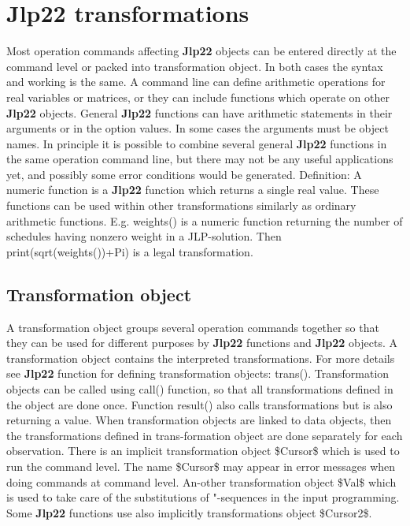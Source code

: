 \section{\textbf{Jlp22} transformations}
\label{jtrans}
Most operation commands affecting \textbf{Jlp22} objects can be entered directly at the command level or
packed into transformation object. In both cases the syntax and working is the same. A
command line can define arithmetic operations for real variables or matrices, or they can
include functions which operate on other \textbf{Jlp22} objects. General \textbf{Jlp22} functions can have arithmetic
statements in their arguments or in the option values. In some cases the arguments must be
object names. In principle it is possible to combine several general \textbf{Jlp22} functions in the same
operation command line, but there may not be any useful applications yet, and possibly some
error conditions would be generated.
Definition: A numeric function is a \textbf{Jlp22} function which returns a single real value. These functions
can be used within other transformations similarly as ordinary arithmetic functions. E.g.
\textcolor{VioletRed}{weights}() is a numeric function returning the number of schedules having nonzero weight
in a JLP-solution. Then \textcolor{VioletRed}{print}(\textcolor{VioletRed}{sqrt}(\textcolor{VioletRed}{weights}())+Pi) is a legal transformation.
\subsection{Transformation object}
\label{transo}
A transformation object groups several operation commands together so that they
can be used for different purposes by \textbf{Jlp22} functions and \textbf{Jlp22} objects. A
transformation object contains the interpreted transformations. For more details
see \textbf{Jlp22} function for defining transformation objects: \textcolor{VioletRed}{trans}().
Transformation objects can be called using \textcolor{VioletRed}{call}() function, so that all
transformations defined in the object are done once. Function result() also calls
transformations but is also returning a value. When transformation objects are
linked to data objects, then the transformations defined in trans-formation object
are done separately for each observation.
There is an implicit transformation object \$Cursor\$ which is used to run the
command level. The name \$Cursor\$ may appear in error messages when doing
commands at command level.  An-other transformation object \$Val\$ which is used to
take care of the substitutions of "-sequences in the input programming. Some \textbf{Jlp22}
functions use also implicitly transformations object \$Cursor2\$.
